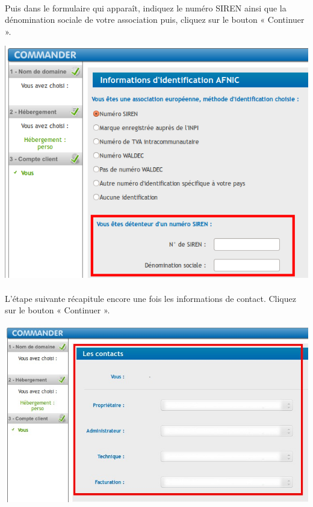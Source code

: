 \documentclass[10pt,a4paper]{article}
\begin{document}
\paragraph{}Puis dans le formulaire qui apparaît, indiquez le numéro SIREN ainsi que la dénomination sociale de votre association puis, cliquez sur le bouton « Continuer ».
\begin{center}
\includegraphics[scale=0.3]{img/0284.png}
\end{center}
\paragraph{}L'étape suivante récapitule encore une fois les informations de contact. Cliquez sur le bouton « Continuer ».
\begin{center}
\includegraphics[scale=0.3]{img/0285.png}
\end{center}
\end{document}
